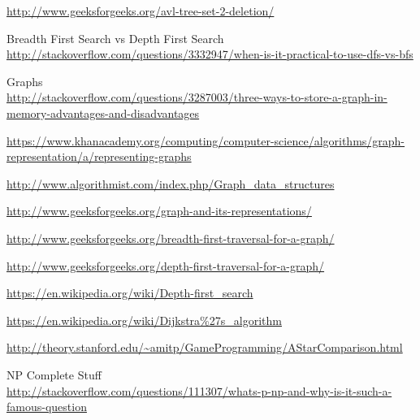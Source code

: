 \documentclass [12pt, executivepaper]{article}
\begin{document}
\begin{center}
\begin{thebibliography}{9}
\url{http://www.geeksforgeeks.org/avl-tree-set-2-deletion/}

Breadth First Search vs Depth First Search \\
\url{http://stackoverflow.com/questions/3332947/when-is-it-practical-to-use-dfs-vs-bfs}

\pagebreak

\vspace*{-40mm}

Graphs \\
\url{http://stackoverflow.com/questions/3287003/three-ways-to-store-a-graph-in-memory-advantages-and-disadvantages}

\vspace{1mm}

\url{https://www.khanacademy.org/computing/computer-science/algorithms/graph-representation/a/representing-graphs}

\vspace{1mm}

\url{http://www.algorithmist.com/index.php/Graph_data_structures}

\vspace{1mm}

\url{http://www.geeksforgeeks.org/graph-and-its-representations/}

\vspace{1mm}

\url{http://www.geeksforgeeks.org/breadth-first-traversal-for-a-graph/}

\vspace{1mm}

\url{http://www.geeksforgeeks.org/depth-first-traversal-for-a-graph/}

\vspace{1mm}

\url{https://en.wikipedia.org/wiki/Depth-first_search}

\vspace{1mm}

\url{https://en.wikipedia.org/wiki/Dijkstra\%27s_algorithm}

\vspace{1mm}

\url{http://theory.stanford.edu/~amitp/GameProgramming/AStarComparison.html}

NP Complete Stuff \\
\url{http://stackoverflow.com/questions/111307/whats-p-np-and-why-is-it-such-a-famous-question}

\vspace{1mm}


\end{thebibliography}
\end{center}
\end{document}
